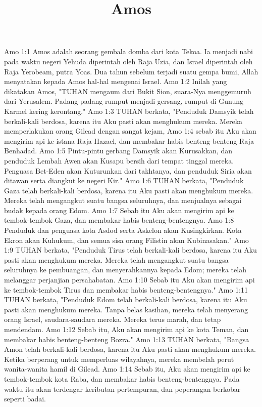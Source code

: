 

\title{Amos}

Amo 1:1  Amos adalah seorang gembala domba dari kota Tekoa. Ia menjadi nabi pada waktu negeri Yehuda diperintah oleh Raja Uzia, dan Israel diperintah oleh Raja Yerobeam, putra Yoas. Dua tahun sebelum terjadi suatu gempa bumi, Allah menyatakan kepada Amos hal-hal mengenai Israel.
Amo 1:2  Inilah yang dikatakan Amos, "TUHAN mengaum dari Bukit Sion, suara-Nya menggemuruh dari Yerusalem. Padang-padang rumput menjadi gersang, rumput di Gunung Karmel kering kerontang."
Amo 1:3  TUHAN berkata, "Penduduk Damsyik telah berkali-kali berdosa, karena itu Aku pasti akan menghukum mereka. Mereka memperlakukan orang Gilead dengan sangat kejam,
Amo 1:4  sebab itu Aku akan mengirim api ke istana Raja Hazael, dan membakar habis benteng-benteng Raja Benhadad.
Amo 1:5  Pintu-pintu gerbang Damsyik akan Kurusakkan, dan penduduk Lembah Awen akan Kusapu bersih dari tempat tinggal mereka. Penguasa Bet-Eden akan Kuturunkan dari takhtanya, dan penduduk Siria akan ditawan serta diangkut ke negeri Kir."
Amo 1:6  TUHAN berkata, "Penduduk Gaza telah berkali-kali berdosa, karena itu Aku pasti akan menghukum mereka. Mereka telah mengangkut suatu bangsa seluruhnya, dan menjualnya sebagai budak kepada orang Edom.
Amo 1:7  Sebab itu Aku akan mengirim api ke tembok-tembok Gaza, dan membakar habis benteng-bentengnya.
Amo 1:8  Penduduk dan penguasa kota Asdod serta Askelon akan Kusingkirkan. Kota Ekron akan Kuhukum, dan semua sisa orang Filistin akan Kubinasakan."
Amo 1:9  TUHAN berkata, "Penduduk Tirus telah berkali-kali berdosa, karena itu Aku pasti akan menghukum mereka. Mereka telah mengangkut suatu bangsa seluruhnya ke pembuangan, dan menyerahkannya kepada Edom; mereka telah melanggar perjanjian persahabatan.
Amo 1:10  Sebab itu Aku akan mengirim api ke tembok-tembok Tirus dan membakar habis benteng-bentengnya."
Amo 1:11  TUHAN berkata, "Penduduk Edom telah berkali-kali berdosa, karena itu Aku pasti akan menghukum mereka. Tanpa belas kasihan, mereka telah menyerang orang Israel, saudara-saudara mereka. Mereka terus marah, dan tetap mendendam.
Amo 1:12  Sebab itu, Aku akan mengirim api ke kota Teman, dan membakar habis benteng-benteng Bozra."
Amo 1:13  TUHAN berkata, "Bangsa Amon telah berkali-kali berdosa, karena itu Aku pasti akan menghukum mereka. Ketika berperang untuk memperluas wilayahnya, mereka membelah perut wanita-wanita hamil di Gilead.
Amo 1:14  Sebab itu, Aku akan mengirim api ke tembok-tembok kota Raba, dan membakar habis benteng-bentengnya. Pada waktu itu akan terdengar keributan pertempuran, dan peperangan berkobar seperti badai.
